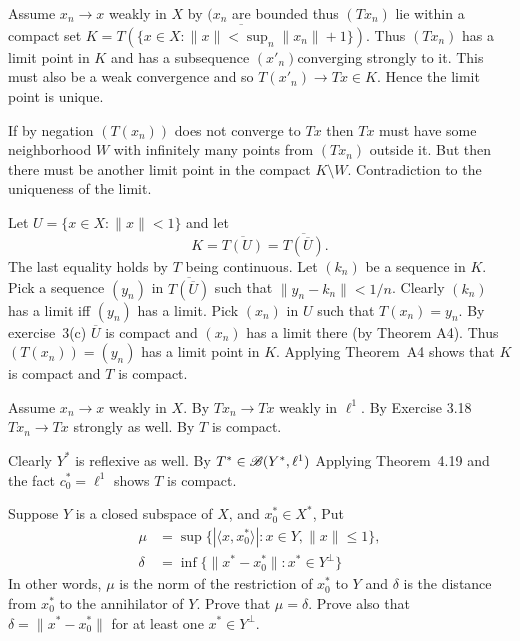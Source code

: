 \begin{enumerate}
\begin{itemize}
Assume \(x_n\to x\) weakly in $X$ by  \((x_n\) are bounded
thus \((Tx_n)\) lie within a compact set 
\(K = \overline{T\left(\{x\in X: \|x\|< \sup_n \|x_n\| + 1\}\right)}\).
Thus  \((Tx_n)\) has a limit point in $K$ and has a subsequence 
\((x'_n)\)converging
strongly to it. This must also be a weak convergence
and so \(T(x'_n) \to Tx \in K\).
Hence the limit point is unique.

If by negation \((T(x_n))\) does not converge to \(Tx\)
then \(Tx\) must have some neighborhood $W$ with infinitely
many points from \((Tx_n)\) outside it.
But then there must be another limit point in the compact \(K\setminus W\).
Contradiction to the uniqueness of the limit.

Let \(U = \{x\in X: \|x\| < 1\}\) and let 
\begin{equation*}
K = \overline{T(U)} = \overline{T(\overline{U})}.
\end{equation*}
The last equality holds by $T$ being continuous.
Let \((k_n)\) be a sequence in $K$.
Pick a sequence \((y_n)\) in \(\overline{T(\overline{U})}\)
such that \(\|y_n - k_n\| < 1/n\).
Clearly  \((k_n)\) has a limit iff  \((y_n)\) has a limit.
Pick \((x_n)\) in $U$ such that \(T(x_n)=y_n\).
By exercise~3(c) \(\overline{U}\) is compact
and \((x_n)\) has a limit there (by Theorem A4).
Thus \((T(x_n))=(y_n)\) has a limit point in $K$.
Applying Theorem~A4 shows that $K$ is compact and $T$ is compact.

Assume \(x_n\to x\) weakly in $X$. By  \(Tx_n \to Tx\) weakly
in \(\ell^1\). By Exercise 3.18 \(Tx_n \to Tx\) strongly as
well.
By  $T$ is compact.

Clearly \(Y^*\) is reflexive as well. 
By  \(T^* \in \mathscr{B}(Y^*,\ell^1)\)
Applying Theorem~4.19 and the fact \(c_0^* = \ell^1\)
shows $T$ is compact.

\end{itemize}


\begin{excopy}
Suppose $Y$ is a closed subspace of $X$, and \(x_0^* \in X^*\), Put
\begin{align*}
\mu &= \sup\{|\langle x, x_0^*\rangle|: x\in Y, \|x\| \leq 1\}, \\
\delta &= \inf\{\| x^* -  x_0^*\|: x^*\in Y^\perp\}
\end{align*}
In other words, \(\mu\) is the norm of the restriction of \(x_0^*\) to $Y$
 and \(\delta\) is the distance from
\(x_0^*\) to the annihilator of $Y$. Prove that \(\mu = \delta\).
 Prove also that \(\delta = \|x^* - x_0^*\|\) for at
least one \(x^* \in Y^\perp \).
\end{excopy}


\end{enumerate}
